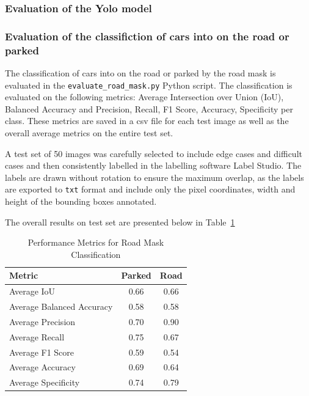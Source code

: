 \subsubsection{Evaluation of the Yolo model}

\subsubsection{Evaluation of the classifiction of cars into on the road or parked}
The classification of cars into on the road or parked by the road mask is evaluated in the \texttt{evaluate\_road\_mask.py} Python script.
The classification is evaluated on the following metrics: Average Intersection over Union (IoU), Balanced Accuracy and Precision, Recall, F1 Score, Accuracy, Specificity per class. These metrics are saved in a csv file for each test image as well as the overall average metrics on the entire test set.

A test set of 50 images was carefully selected to include edge cases and difficult cases and then consistently labelled in the labelling software Label Studio. The labels are drawn without rotation to ensure the maximum overlap, as the labels are exported to \texttt{txt} format and include only the pixel coordinates, width and  height of the bounding boxes annotated.

The overall results on test set are presented below in Table~\ref{tab:metrics1}

\begin{table}[h]
  \centering
  \begin{tabular}{|l|c|c|}
    \hline
    \textbf{Metric}           & \textbf{Parked} & \textbf{Road} \\ \hline
    Average IoU               & 0.66            & 0.66          \\ \hline
    Average Balanced Accuracy & 0.58            & 0.58          \\ \hline
    Average Precision         & 0.70            & 0.90          \\ \hline
    Average Recall            & 0.75            & 0.67          \\ \hline
    Average F1 Score          & 0.59            & 0.54          \\ \hline
    Average Accuracy          & 0.69            & 0.64          \\ \hline
    Average Specificity       & 0.74            & 0.79          \\ \hline
  \end{tabular}
  \caption{Performance Metrics for Road Mask Classification}
  \label{tab:metrics1}
\end{table}

